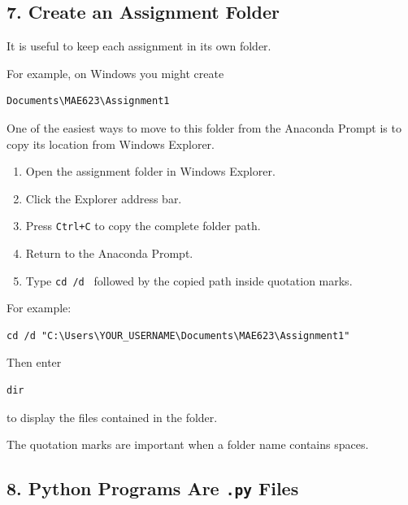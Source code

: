 \documentclass[11pt]{article}
\begin{document}
\subsection*{7. Create an Assignment Folder}

It is useful to keep each assignment in its own folder.

For example, on Windows you might create

\begin{lstlisting}
Documents\MAE623\Assignment1
\end{lstlisting}

One of the easiest ways to move to this folder from the Anaconda Prompt
is to copy its location from Windows Explorer.

\begin{enumerate}
    \item Open the assignment folder in Windows Explorer.
    \item Click the Explorer address bar.
    \item Press \texttt{Ctrl+C} to copy the complete folder path.
    \item Return to the Anaconda Prompt.
    \item Type \texttt{cd /d } followed by the copied path inside
          quotation marks.
\end{enumerate}

For example:

\begin{lstlisting}
cd /d "C:\Users\YOUR_USERNAME\Documents\MAE623\Assignment1"
\end{lstlisting}

Then enter

\begin{lstlisting}
dir
\end{lstlisting}

to display the files contained in the folder.

The quotation marks are important when a folder name contains spaces.

\subsection*{8. Python Programs Are \texttt{.py} Files}
\end{document}
